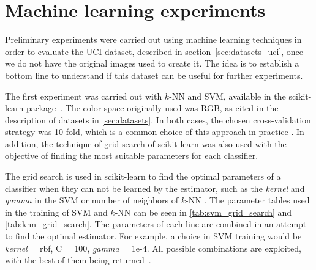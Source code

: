 \section{Machine learning experiments}
\label{sec:ml_experiments}
Preliminary experiments were carried out using machine learning techniques in order to evaluate the UCI dataset, described in section~\ref{sec:datasets_uci}, once we do not have the original images used to create it. The idea is to establish a bottom line to understand if this dataset can be useful for further experiments.

The first experiment was carried out with $k$-NN and SVM, available in the scikit-learn package~\citep{scikit-learn:11}. The color space originally used was RGB, as cited in the description of datasets in \ref{sec:datasets}. In both cases, the chosen cross-validation strategy was 10-fold, which is a common choice of this approach in practice \citep{mostafa:12}. In addition, the technique of grid search of scikit-learn was also used with the objective of finding the most suitable parameters for each classifier.

The grid search is used in scikit-learn to find the optimal parameters of a classifier when they can not be learned by the estimator, such as the \emph{kernel} and \emph{gamma} in the SVM or number of neighbors of $k$-NN \citep{scikit-learn:11}. The parameter tables used in the training of SVM and $k$-NN can be seen in \ref{tab:svm_grid_search} and \ref{tab:knn_grid_search}. The parameters of each line are combined in an attempt to find the optimal estimator. For example, a choice in SVM training would be \emph{kernel} = rbf, C = 100, \emph{gamma} = 1e-4. All possible combinations are exploited, with the best of them being returned~\citep{scikit-learn:11}.

